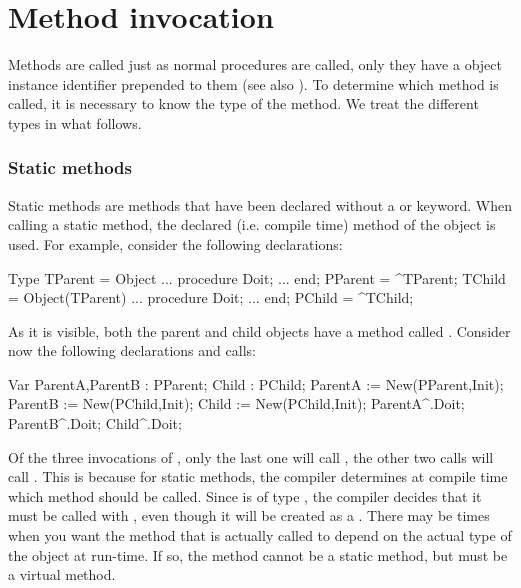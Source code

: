 \documentclass{report}
\begin{document}
\section{Method invocation}
Methods are called just as normal procedures are called, only they have a 
object instance identifier prepended to them (see also ).
To determine which method is called, it is necessary to know the type of
the method. We treat the different types in what follows.
\subsubsection{Static methods}
Static methods are methods that have been declared without a 
or  keyword. When calling a static method, the declared (i.e.
compile time) method of the object is used.
For example, consider the following declarations:
\begin{listing}
Type
  TParent = Object 
    ...
    procedure Doit;
    ...
    end;
  PParent = ^TParent;
  TChild = Object(TParent) 
    ...
    procedure Doit;
    ...
    end;
  PChild = ^TChild;  
\end{listing}
As it is visible, both the parent and child objects have a method called
. Consider now the following declarations and calls:
\begin{listing}
Var ParentA,ParentB : PParent;
    Child           : PChild;
   ParentA := New(PParent,Init);
   ParentB := New(PChild,Init);
   Child := New(PChild,Init);
   ParentA^.Doit;
   ParentB^.Doit;
   Child^.Doit;
\end{listing}
Of the three invocations of , only the last one will call
, the other two calls will call .
This is because for static methods, the compiler determines at compile 
time which method should be called. Since  is of type
, the compiler decides that it must be called with
, even though it will be created as a .
There may be times when you want the method that is actually called to
depend on the actual type of the object at run-time. If so, the method
cannot be a static method, but must be a virtual method.
\end{document}
